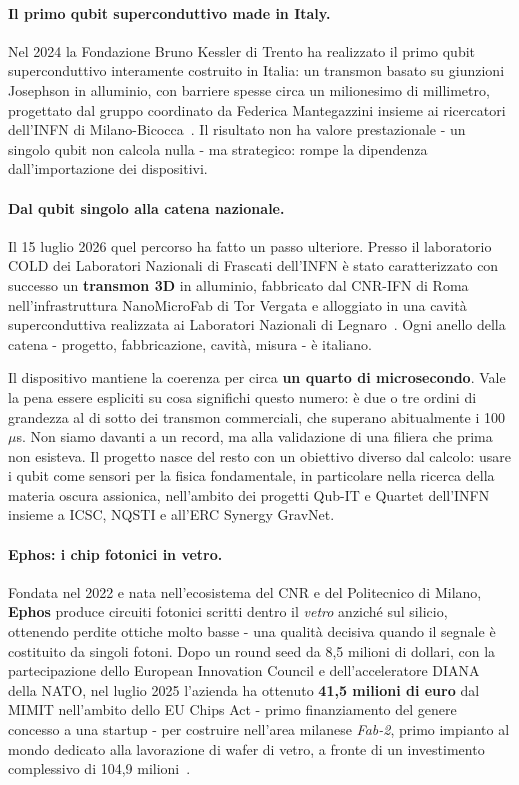 \paragraph{Il primo qubit superconduttivo made in Italy.}
Nel 2024 la Fondazione Bruno Kessler di Trento ha realizzato il primo qubit
superconduttivo interamente costruito in Italia: un transmon basato su
giunzioni Josephson in alluminio, con barriere spesse circa un milionesimo di
millimetro, progettato dal gruppo coordinato da Federica Mantegazzini insieme
ai ricercatori dell'INFN di Milano-Bicocca~\cite{fbk2024qubit}. Il risultato
non ha valore prestazionale - un singolo qubit non calcola nulla - ma
strategico: rompe la dipendenza dall'importazione dei dispositivi.

\paragraph{Dal qubit singolo alla catena nazionale.}
Il 15 luglio 2026 quel percorso ha fatto un passo ulteriore. Presso il
laboratorio COLD dei Laboratori Nazionali di Frascati dell'INFN è stato
caratterizzato con successo un \textbf{transmon 3D} in alluminio, fabbricato
dal CNR-IFN di Roma nell'infrastruttura NanoMicroFab di Tor Vergata e
alloggiato in una cavità superconduttiva realizzata ai Laboratori Nazionali di
Legnaro~\cite{cnr2026transmon}. Ogni anello della catena - progetto,
fabbricazione, cavità, misura - è italiano.

Il dispositivo mantiene la coerenza per circa \textbf{un quarto di
microsecondo}. Vale la pena essere espliciti su cosa significhi questo numero:
è due o tre ordini di grandezza al di sotto dei transmon commerciali, che
superano abitualmente i 100\,$\mu$s. Non siamo davanti a un record, ma alla
validazione di una filiera che prima non esisteva. Il progetto nasce del resto
con un obiettivo diverso dal calcolo: usare i qubit come sensori per la fisica
fondamentale, in particolare nella ricerca della materia oscura assionica,
nell'ambito dei progetti Qub-IT e Quartet dell'INFN insieme a ICSC, NQSTI e
all'ERC Synergy GravNet.

\paragraph{Ephos: i chip fotonici in vetro.}
Fondata nel 2022 e nata nell'ecosistema del CNR e del Politecnico di Milano,
\textbf{Ephos} produce circuiti fotonici scritti dentro il \textit{vetro}
anziché sul silicio, ottenendo perdite ottiche molto basse - una qualità
decisiva quando il segnale è costituito da singoli fotoni. Dopo un round seed
da 8,5 milioni di dollari, con la partecipazione dello European Innovation
Council e dell'acceleratore DIANA della NATO, nel luglio 2025 l'azienda ha
ottenuto \textbf{41,5 milioni di euro} dal MIMIT nell'ambito dello EU Chips
Act - primo finanziamento del genere concesso a una startup - per costruire
nell'area milanese \textit{Fab-2}, primo impianto al mondo dedicato alla
lavorazione di wafer di vetro, a fronte di un investimento complessivo di
104,9 milioni~\cite{mimit2025ephos}.

